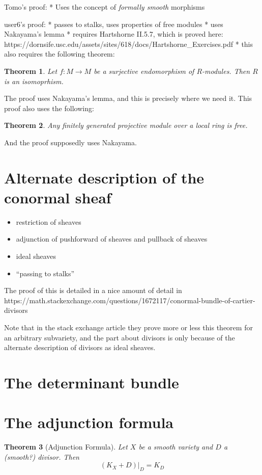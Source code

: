 \documentclass[a4paper]{article}
\newtheorem{thm}{Theorem}[section]
\begin{document}
Tomo's proof:
* Uses the concept of \textit{formally smooth} morphisms

user6's proof:
* passes to stalks, uses properties of free modules
* uses Nakayama's lemma
* requires Hartshorne II.5.7, which is proved here:
https://dornsife.usc.edu/assets/sites/618/docs/Hartshorne\_Exercises.pdf
* this also requires the following theorem:
\begin{thm}
	Let \(f: M \to M\) be a surjective endomorphism of \(R\)-modules.
	Then \(R\) is an isomoprhism.
\end{thm}
The proof uses Nakayama's lemma, and this is precisely where we need it.
This proof also uses the following:
\begin{thm}
	Any finitely generated projective module over a local ring
	is free.
\end{thm}
And the proof supposedly uses Nakayama.






\section{Alternate description of the conormal sheaf}

\begin{itemize}
	\item restriction of sheaves
	\item adjunction of pushforward of sheaves and pullback of sheaves
	\item ideal sheaves
	\item ``passing to stalks''
\end{itemize}

The proof of this is detailed in a nice amount of detail in
https://math.stackexchange.com/questions/1672117/conormal-bundle-of-cartier-divisors

Note that in the stack exchange article they prove more or less this 
theorem for an arbitrary subvariety, and the part about divisors
is only because of the alternate description of divisors as ideal sheaves.

\section{The determinant bundle}


\section{The adjunction formula}


\begin{thm}[Adjunction Formula]
	Let \(X\) be a smooth variety and \(D\) a
	(smooth?) divisor. 
	Then 
	\[
		(K_{X} + D)|_{D} = K_{D}
	\] 
	
\end{thm}
\end{document}
